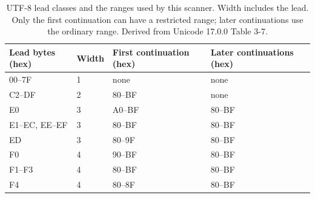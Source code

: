 \begin{table}[htbp]
  \centering
  \small
  \begin{tabular}{llll}
    \toprule
    Lead bytes (hex) & Width & First continuation (hex) & Later continuations (hex) \\
    \midrule
    00--7F           & 1     & none                     & none                      \\
    C2--DF           & 2     & 80--BF                   & none                      \\
    E0               & 3     & A0--BF                   & 80--BF                    \\
    E1--EC, EE--EF   & 3     & 80--BF                   & 80--BF                    \\
    ED               & 3     & 80--9F                   & 80--BF                    \\
    F0               & 4     & 90--BF                   & 80--BF                    \\
    F1--F3           & 4     & 80--BF                   & 80--BF                    \\
    F4               & 4     & 80--8F                   & 80--BF                    \\
    \bottomrule
  \end{tabular}
  \caption{UTF-8 lead classes and the ranges used by this scanner. Width includes the lead. Only the first continuation can have a restricted range; later continuations use the ordinary range. Derived from Unicode 17.0.0 Table 3-7.}
  \label{tab:revision-utf8-leads}
\end{table}
